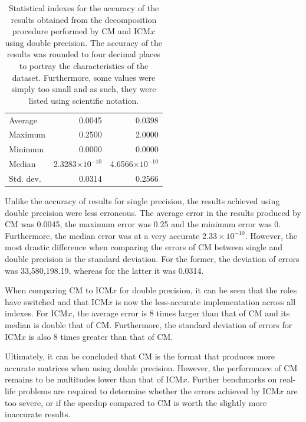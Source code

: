 \begin{table}[ht!]
	\centering
	\renewcommand{\arraystretch}{1.5}
	\begin{tabular}{|>{\footnotesize}l|>{\raggedleft\arraybackslash\footnotesize}r|>{\raggedleft\arraybackslash\footnotesize}r|}
		\hline
		\multicolumn{1}{|>{\centering\footnotesize}c|}{Accuracy index} & \multicolumn{1}{>{\centering\footnotesize}c|}{CM} & \multicolumn{1}{>{\centering\footnotesize}c|}{ICM$ x $} \\
		\hline
		Average   & 0.0045                   & 0.0398                   \\
		Maximum   & 0.2500                   & 2.0000                   \\
		Minimum   & 0.0000                   & 0.0000                   \\
		Median    & 2.3283$\times 10^{-10}$  & 4.6566$\times 10^{-10}$ \\
		Std. dev. & 0.0314                   & 0.2566                   \\
		\hline
	\end{tabular}
	\caption{Statistical indexes for the accuracy of the results obtained from the decomposition procedure performed by CM and ICM$ x $ using double precision. The accuracy of the results was rounded to four decimal places to portray the characteristics of the dataset. Furthermore, some values were simply too small and as such, they were listed using scientific notation.}
	\label{Table:comparing-decomposition-implementations-performance-of-implementations-across-all-matrices-accuracy-statistical-indexes-double-precision}
\end{table}

Unlike the accuracy of results for single precision, the results achieved using double precision were less erroneous. The average error in the results produced by CM was 0.0045, the maximum error was 0.25 and the minimum error was 0. Furthermore, the median error was at a very accurate $2.33\times 10^{-10}$. However, the most drastic difference when comparing the errors of CM between single and double precision is the standard deviation. For the former, the deviation of errors was 33,580,198.19, whereas for the latter it was 0.0314.
\par When comparing CM to ICM$ x $ for double precision, it can be seen that the roles have switched and that ICM$ x $ is now the less-accurate implementation across all indexes. For ICM$ x $, the average error is 8 times larger than that of CM and its median is double that of CM. Furthermore, the standard deviation of errors for ICM$ x $ is also 8 times greater than that of CM.
\par Ultimately, it can be concluded that CM is the format that produces more accurate matrices when using double precision. However, the performance of CM remains to be multitudes lower than that of ICM$ x $. Further benchmarks on real-life problems are required to determine whether the errors achieved by ICM$ x $ are too severe, or if the speedup compared to CM is worth the slightly more inaccurate results.


